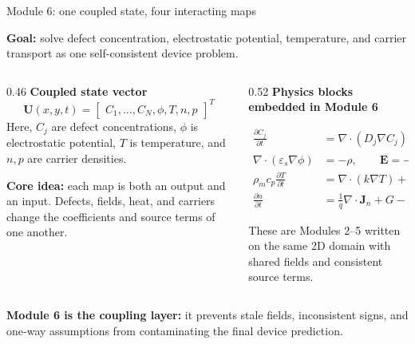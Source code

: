 \documentclass[aspectratio=169,9pt]{beamer}
\newcommand{\Uvec}{\bm{U}}
\newcommand{\Evec}{\bm{E}}
\newcommand{\Jn}{\bm{J}_n}
\newcommand{\Jp}{\bm{J}_p}
\newcommand{\grad}{\nabla}
\newcommand{\diverg}{\nabla\!\cdot}
\newcommand{\epss}{\varepsilon_s}
\newcommand{\rhom}{\rho_m}
\newcommand{\cp}{c_p}
\begin{document}
\begin{frame}{Module 6: one coupled state, four interacting maps}
\footnotesize

\begin{bluebox}
\centering\small
\textbf{Goal:} solve defect concentration, electrostatic potential, temperature, and carrier transport as one self-consistent device problem.
\end{bluebox}

\vspace{1.2mm}
\begin{columns}[T,totalwidth=\textwidth]
\begin{column}{0.46\textwidth}
\textbf{Coupled state vector}
\begin{equation*}
\boxed{
\Uvec(x,y,t)=
\begin{bmatrix}
C_1,\ldots,C_N,\phi,T,n,p
\end{bmatrix}^{T}}
\end{equation*}
\small
Here, \(C_j\) are defect concentrations, \(\phi\) is electrostatic potential, \(T\) is temperature, and \(n,p\) are carrier densities.

\vspace{1.5mm}
\begin{purplebox}
\textbf{Core idea:} each map is both an output and an input. Defects, fields, heat, and carriers change the coefficients and source terms of one another.
\end{purplebox}
\end{column}

\begin{column}{0.52\textwidth}
\textbf{Physics blocks embedded in Module 6}
\begin{bluebox}
\scriptsize
\begin{align*}
\frac{\partial C_j}{\partial t}
&=\diverg(D_j\grad C_j)-\diverg(\mu_j z_j q C_j\Evec)+R_j+S_j,\\
\diverg(\epss\grad\phi)&=-\rho,\qquad \Evec=-\grad\phi,\\
\rhom\cp\frac{\partial T}{\partial t}
&=\diverg(k\grad T)+Q_{\mathrm{tot}},\\
\frac{\partial n}{\partial t}
&=\frac{1}{q}\diverg\Jn+G-R,\qquad
\frac{\partial p}{\partial t}=-\frac{1}{q}\diverg\Jp+G-R.
\end{align*}
\end{bluebox}
\small
These are Modules 2--5 written on the same 2D domain with shared fields and consistent source terms.
\end{column}
\end{columns}

\vspace{1.2mm}
\begin{orangebox}
\centering\scriptsize
\textbf{Module 6 is the coupling layer:} it prevents stale fields, inconsistent signs, and one-way assumptions from contaminating the final device prediction.
\end{orangebox}
\end{frame}
\end{document}
